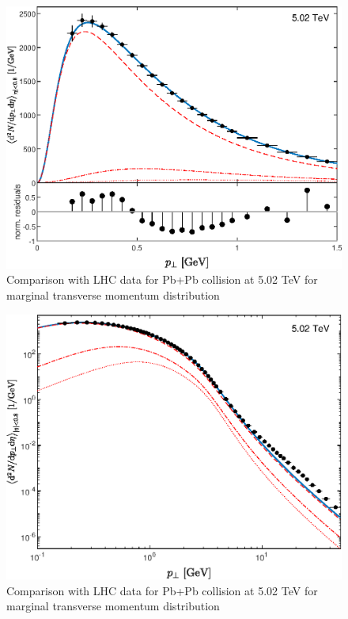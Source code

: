 \documentclass[a4paper,12pt]{book}
\begin{document}
\begin{figure}
	\begin{center}
		\centering
		\includegraphics[width=\linewidth]{images/Pb_502_plot_pT_FP.eps}
		\caption{Comparison with LHC data for Pb+Pb collision at 5.02 TeV for marginal transverse momentum distribution}
		\label{fig:Pb_502_pT}
	\end{center}
\end{figure}

\begin{figure}
	\begin{center}
		\centering
		\includegraphics[width=\linewidth]{images/Pb_502_plot_pT_FP_loglog.eps}
		\caption{Comparison with LHC data for Pb+Pb collision at 5.02 TeV for marginal transverse momentum distribution}
		\label{fig:Pb_502_pT_loglog}
	\end{center}
\end{figure}
\end{document}
